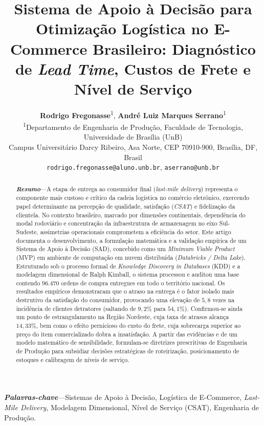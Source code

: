 \documentclass[10pt,a4paper,twocolumn]{article}
\title{\textbf{\Large Sistema de Apoio à Decisão para Otimização Logística no E-Commerce Brasileiro: Diagnóstico de \textit{Lead Time}, Custos de Frete e Nível de Serviço}}
\author{
    \textbf{Rodrigo Fregonasse}\textsuperscript{1}, 
    \textbf{André Luiz Marques Serrano}\textsuperscript{1} \\
    \small \textsuperscript{1}Departamento de Engenharia de Produção, Faculdade de Tecnologia, Universidade de Brasília (UnB) \\
    \small Campus Universitário Darcy Ribeiro, Asa Norte, CEP 70910-900, Brasília, DF, Brasil \\
    \small \texttt{rodrigo.fregonasse@aluno.unb.br}, \texttt{aserrano@unb.br}
}
\date{}
\begin{document}
\maketitle

\begin{abstract}
\textbf{\textit{Resumo}}---A etapa de entrega ao consumidor final (\textit{last-mile delivery}) representa o componente mais custoso e crítico da cadeia logística no comércio eletrônico, exercendo papel determinante na percepção de qualidade, satisfação (\textit{CSAT}) e fidelização da clientela. No contexto brasileiro, marcado por dimensões continentais, dependência do modal rodoviário e concentração da infraestrutura de armazenagem no eixo Sul-Sudeste, assimetrias operacionais comprometem a eficiência do setor. Este artigo documenta o desenvolvimento, a formulação matemática e a validação empírica de um Sistema de Apoio à Decisão (SAD), concebido como um \textit{Minimum Viable Product} (MVP) em ambiente de computação em nuvem distribuída (\textit{Databricks / Delta Lake}). Estruturado sob o processo formal de \textit{Knowledge Discovery in Databases} (KDD) e a modelagem dimensional de Ralph Kimball, o sistema processou e auditou uma base contendo $96.470$ ordens de compra entregues em todo o território nacional. Os resultados empíricos demonstraram que o atraso na entrega é o fator isolado mais destrutivo da satisfação do consumidor, provocando uma elevação de $5,8$ vezes na incidência de clientes detratores (saltando de $9,2\%$ para $54,1\%$). Confirmou-se ainda um ponto de estrangulamento na Região Nordeste, cuja taxa de atrasos alcança $14,33\%$, bem como o efeito pernicioso do custo do frete, cuja sobrecarga superior ao preço do item comercializado dobra a insatisfação. A partir das evidências e de um modelo matemático de sensibilidade, formulam-se diretrizes prescritivas de Engenharia de Produção para subsidiar decisões estratégicas de roteirização, posicionamento de estoques e calibragem de níveis de serviço.
\end{abstract}

\noindent\textbf{\textit{Palavras-chave}}---Sistemas de Apoio à Decisão, Logística de E-Commerce, \textit{Last-Mile Delivery}, Modelagem Dimensional, Nível de Serviço (CSAT), Engenharia de Produção.

\vspace{0.8em}
\end{document}
